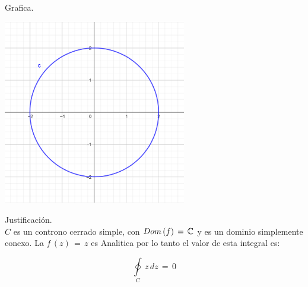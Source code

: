 \documentclass[a4paper,11pt,openany]{book}
\begin{document}
\begin{tcolorbox}[colback=ao(english)!5!white,colframe=ao(english)!75!black,fonttitle=\bfseries,title=\sf $I_{1}$]

\textcolor{ao(english)}{} Grafica.

\begin{center}
     \includegraphics[width=8cm]{Gra-Ej-9-1.png}
\end{center}

\textcolor{ao(english)}{} Justificación.\\

$C$ es un controno cerrado simple, con $\mathnormal{Dom\,(f)}\,=\,\mathbb C$ y  es un dominio simplemente conexo. La $f\,(z)\,=\,z$ es Analitica por lo tanto el valor de esta integral es:

$$\displaystyle\oint\limits_{C}\,z\,dz\,=\,0$$

\end{tcolorbox}

\newpage
\end{document}
